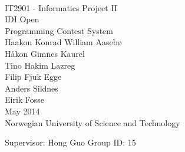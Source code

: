 \thispagestyle{empty}

\mbox{}\\[6pc]
\begin{center}
\Huge{IT2901 - Informatics Project II}\\[2pc]
\huge{IDI Open}\\
\huge{Programming Contest System}\\[2pc]


\Large{Haakon Konrad William Aaseb{\o}}\\
\Large{H{\aa}kon Gimnes Kaurel}\\
\Large{Tino Hakim Lazreg}\\
\Large{Filip Fjuk Egge}\\
\Large{Anders Sildnes}\\
\Large{Eirik Fosse}\\[1pc]

\large{May 2014}\\[2pc]

Norwegian University of Science and Technology
\end{center}
\vfill

\noindent Supervisor: Hong Guo \hfill Group ID: 15

